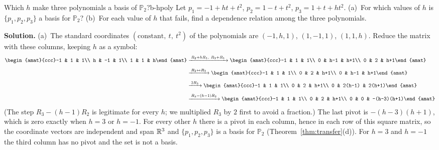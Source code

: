 \documentclass[11pt]{article}
\begin{document}
\begin{exmp}{Which $h$ make three polynomials a basis of $\mathbb P_2$?}{b-hpoly}
Let $p_1=-1+ht+t^2$, $p_2=1-t+t^2$, $p_3=1+t+ht^2$. (a)~For which values of $h$ is $\{p_1,p_2,p_3\}$ a basis for $\mathbb{P}_2$? (b)~For each value of $h$ that fails, find a dependence relation among the three polynomials.

\textbf{Solution.} (a)~The standard coordinates $(\text{constant},\ t,\ t^2)$ of the polynomials are $(-1,h,1)$, $(1,-1,1)$, $(1,1,h)$. Reduce the matrix with these columns, keeping $h$ as a symbol:
\begin{align*}
\begin{amat}{ccc}-1 & 1 & 1\\ h & -1 & 1\\ 1 & 1 & h\end{amat}
&\rops{R_2+hR_1,\ R_3+R_1}
\begin{amat}{ccc}-1 & 1 & 1\\ 0 & h-1 & h+1\\ 0 & 2 & h+1\end{amat}
\\[4pt]
&\rops{R_2\leftrightarrow R_3}
\begin{amat}{ccc}-1 & 1 & 1\\ 0 & 2 & h+1\\ 0 & h-1 & h+1\end{amat}
\\[4pt]
&\rops{2R_3}
\begin{amat}{ccc}-1 & 1 & 1\\ 0 & 2 & h+1\\ 0 & 2(h-1) & 2(h+1)\end{amat}
\\[4pt]
&\rops{R_3-(h-1)R_2}
\begin{amat}{ccc}-1 & 1 & 1\\ 0 & 2 & h+1\\ 0 & 0 & -(h-3)(h+1)\end{amat}
\end{align*}
(The step $R_3-(h-1)R_2$ is legitimate for every $h$; we multiplied $R_3$ by $2$ first to avoid a fraction.) The last pivot is $-(h-3)(h+1)$, which is zero exactly when $h=3$ or $h=-1$. For every other $h$ there is a pivot in each column, hence in each row of this square matrix, so the coordinate vectors are independent and span $\mathbb{R}^3$ and $\{p_1,p_2,p_3\}$ is a basis for $\mathbb{P}_2$ (Theorem~\ref{thm:transfer}(d)). For $h=3$ and $h=-1$ the third column has no pivot and the set is not a basis.


\end{exmp}
\end{document}
